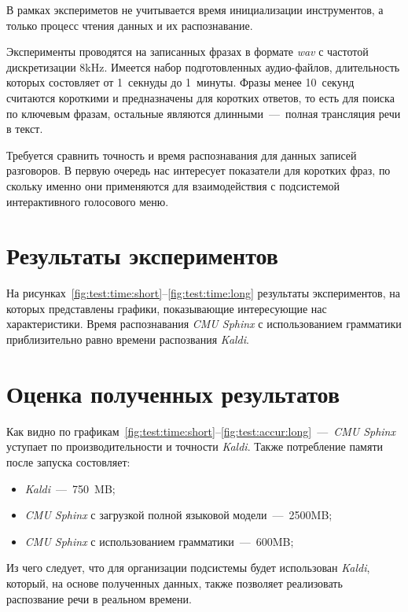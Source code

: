 В рамках экспериметов не учитывается время инициализации инструментов, а только
процесс чтения данных и их распознавание.

Эксперименты проводятся на записанных фразах в формате \textit{wav} с частотой
дискретизации 8kHz. Имеется набор подготовленных аудио-файлов, длительность
которых состовляет от 1~секнуды до 1~минуты.
Фразы менее 10~секунд считаются короткими и предназначены для коротких ответов,
то есть для поиска по ключевым фразам, остальные являются длинными~---~полная
трансляция речи в текст.

Требуется сравнить точность и время распознавания для данных записей разговоров.
В первую очередь нас интересует показатели для коротких фраз, по скольку именно
они применяются для взаимодействия с подсистемой интерактивного голосового меню.

\section{Результаты экспериментов}
На рисунках~\ref{fig:test:time:short}--\ref{fig:test:time:long} результаты
экспериментов, на которых представлены графики, показывающие интересующие нас
характеристики. Время распознавания \textit{CMU Sphinx} с использованием
грамматики приблизительно равно времени распозвания \textit{Kaldi}.



\section{Оценка полученных результатов}

Как видно по графикам~\ref{fig:test:time:short}--\ref{fig:test:accur:long}~---~\textit{CMU Sphinx}
уступает по производительности и точности \textit{Kaldi}. Также потребление памяти после
запуска состовляет:
\begin{itemize}
    \item \textit{Kaldi}~---~750~MB;
    \item \textit{CMU Sphinx} с загрузкой полной языковой модели~---~2500MB;
    \item \textit{CMU Sphinx} с использованием грамматики~---~600MB;
\end{itemize}

Из чего следует, что для организации подсистемы будет использован \textit{Kaldi},
который, на основе полученных данных, также позволяет реализовать распозвание речи
в реальном времени.
